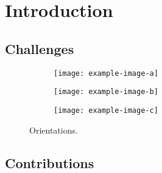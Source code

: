 \chapter{Introduction}

\section{Challenges}\label{section:challanges}
\begin{figure}[ht]
	\centering
	\begin{subfigure}[b]{0.325\linewidth}
		\centering\texttt{[image: example-image-a]}
		\caption{\label{figure:parallel-orientation}}
	\end{subfigure}%
	\hfill
	\begin{subfigure}[b]{0.325\linewidth}
		\centering\texttt{[image: example-image-b]}
		\caption{\label{figure:oblique-orientation}}
	\end{subfigure}%
	\hfill
	\begin{subfigure}[b]{0.325\linewidth}
		\centering\texttt{[image: example-image-c]}
		\caption{\label{figure:perpendicular-orientation}}
	\end{subfigure}
	\caption{Orientations.}
\end{figure}

\section{Contributions}
